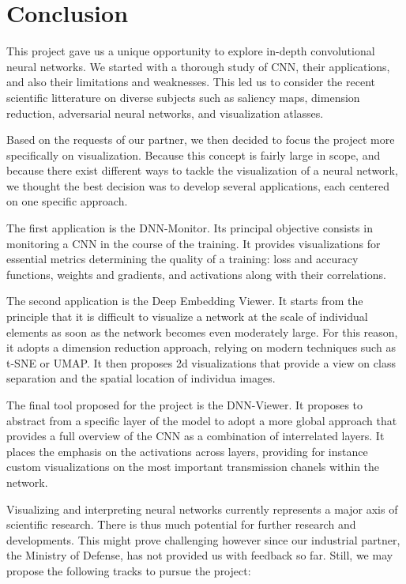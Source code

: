 \newpage

\section{Conclusion}
\label{conclusion}

This project gave us a unique opportunity to explore in-depth convolutional neural networks. We started with a thorough study of CNN, their applications, and also their limitations and weaknesses. This led us to consider the recent scientific litterature on diverse subjects such as saliency maps, dimension reduction, adversarial neural networks, and visualization atlasses.

Based on the requests of our partner, we then decided to focus the project more specifically on visualization.  Because this concept is fairly large in scope, and because there exist different ways to tackle the visualization of a neural network, we thought the best decision was to develop several applications, each centered on one specific approach.

The first application is the DNN-Monitor. Its principal objective consists in monitoring a CNN in the course of the training. It provides visualizations for essential metrics determining the quality of a training: loss and accuracy functions, weights and gradients, and activations along with their correlations.

The second application is the Deep Embedding Viewer. It starts from the principle that it is difficult to visualize a network at the scale of individual elements as soon as the network becomes even moderately large. For this reason, it adopts a dimension reduction approach, relying on modern techniques such as t-SNE or UMAP. It then proposes 2d visualizations that provide a view on class separation and the spatial location of individua images.

The final tool proposed for the project is the DNN-Viewer. It proposes to abstract from a specific layer of the model to adopt a more global approach that provides a full overview of the CNN as a combination of interrelated layers. It places the emphasis on the activations across layers, providing for instance custom visualizations on the most important transmission chanels within the network.

Visualizing and interpreting neural networks currently represents a major axis of scientific research. There is thus much potential for further research and developments. This might prove challenging however since our industrial partner, the Ministry of Defense, has not provided us with feedback so far. Still, we may propose the following tracks to pursue the project:

